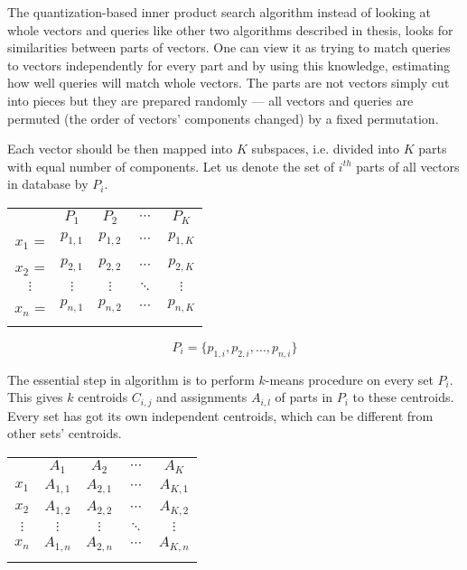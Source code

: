 The quantization-based inner product search algorithm \cite{quantization}
instead of looking at whole vectors and queries like other two algorithms described in thesis,
looks for similarities between parts of vectors.
One can view it as trying to match queries to vectors independently for every part and
by using this knowledge, estimating how well queries will match whole vectors.
The parts are not vectors simply cut into pieces but they are prepared randomly
 --- all vectors and queries are permuted (the order of vectors' components changed)
by a fixed permutation.
\par
Each vector should be then mapped into $K$ subspaces, i.e. divided into $K$ parts with equal number of components.
Let us denote the set of $i^{th}$ parts of all vectors in database by $P_i$.
\begin{center}
\renewcommand{\arraystretch}{1.2}
\begin{tabular}{c|c|c|c|c|}
\multicolumn{1}{r}{} & \multicolumn{1}{c}{$P_{1}$} & \multicolumn{1}{c}{$P_{2}$}
& \multicolumn{1}{c}{$\cdots$} & \multicolumn{1}{c}{$P_{K}$} \\
\hhline{~----}
$x_1$ = & $p_{1,1}$ & $p_{1,2}$ & $\cdots$ & $p_{1,K}$ \\
\hhline{~----}
$x_2$ = & $p_{2,1}$ & $p_{2,2}$ & $\cdots$ & $p_{2,K}$ \\
\hhline{~----}
$\vdots$ & $\vdots$ & $\vdots$ & $\ddots$ & $\vdots$ \\
\hhline{~----}
$x_n$ = & $p_{n,1}$ & $p_{n,2}$ & $\cdots$ & $p_{n,K}$ \\
\hhline{~----}
\end{tabular}
\end{center}

\begin{equation*}
P_i = \{ p_{1,i}, p_{2,i}, \ldots, p_{n,i} \}
\end{equation*}

The essential step in algorithm is to perform $k$-means procedure on every set $P_i$.
This gives $k$ centroids $C_{i,j}$ and assignments $A_{i,l}$ of parts in $P_i$ to these centroids.
Every set has got its own independent centroids, which can be different from other sets' centroids.

\begin{center}
\renewcommand{\arraystretch}{1.2}
\begin{tabular}{c|c|c|c|c|}
\multicolumn{1}{r}{} & \multicolumn{1}{c}{$A_{1}$} & \multicolumn{1}{c}{$A_{2}$}
& \multicolumn{1}{c}{$\cdots$} & \multicolumn{1}{c}{$A_{K}$} \\
\hhline{~----}
$x_1$ & $A_{1,1}$ & $A_{2,1}$ & $\cdots$ & $A_{K,1}$ \\
\hhline{~----}
$x_2$ & $A_{1,2}$ & $A_{2,2}$ & $\cdots$ & $A_{K,2}$ \\
\hhline{~----}
$\vdots$ & $\vdots$ & $\vdots$ & $\ddots$ & $\vdots$ \\
\hhline{~----}
$x_n$ & $A_{1,n}$ & $A_{2,n}$ & $\cdots$ & $A_{K,n}$ \\
\hhline{~----}
\end{tabular}
\end{center}

